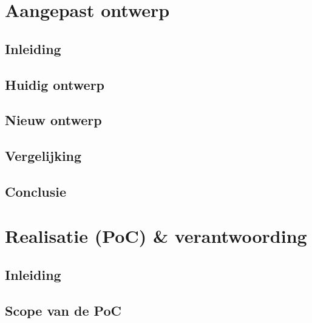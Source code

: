 \documentclass[11pt, a4paper]{report}
\begin{document}
\chapter{Aangepast ontwerp}

\section{Inleiding}

\section{Huidig ontwerp}

\section{Nieuw ontwerp}

\section{Vergelijking}

\section{Conclusie}


\chapter{Realisatie (PoC) \& verantwoording}

\section{Inleiding}

\section{Scope van de PoC}
\end{document}
